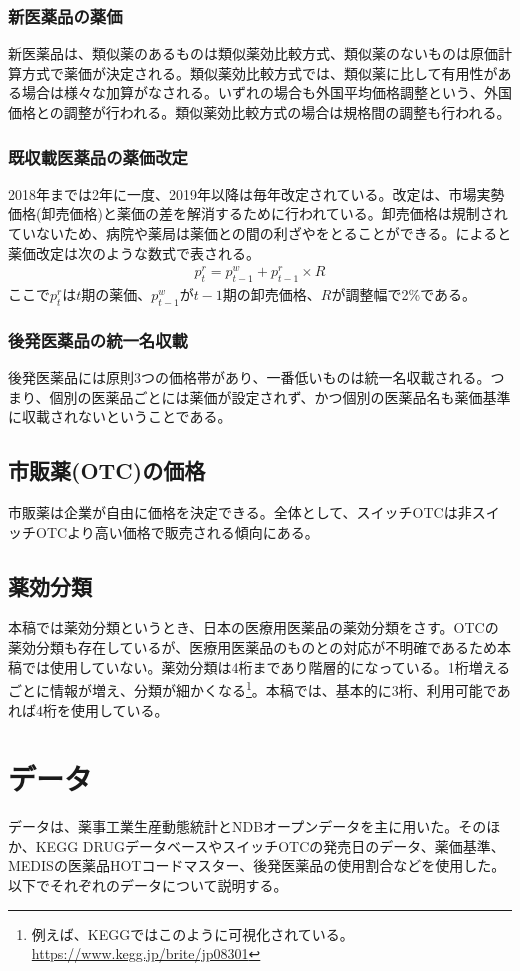 \documentclass[a4paper,11pt,uplatex]{jsarticle}
\theoremstyle{definition}
\begin{document}
\subsubsection{新医薬品の薬価}
新医薬品は、類似薬のあるものは類似薬効比較方式、類似薬のないものは原価計算方式で薬価が決定される。類似薬効比較方式では、類似薬に比して有用性がある場合は様々な加算がなされる。いずれの場合も外国平均価格調整という、外国価格との調整が行われる。類似薬効比較方式の場合は規格間の調整も行われる。
\subsubsection{既収載医薬品の薬価改定}
2018年までは2年に一度、2019年以降は毎年改定されている。改定は、市場実勢価格(卸売価格)と薬価の差を解消するために行われている。卸売価格は規制されていないため、病院や薬局は薬価との間の利ざやをとることができる。\cite{Iizuka2007}によると薬価改定は次のような数式で表される。
\begin{align*}
p^r_t=p^w_{t-1}+p^r_{t-1}\times R
\end{align*}
ここで\(p^r_t\)は\(t\)期の薬価、\(p^w_{t-1}\)が\(t-1\)期の卸売価格、\(R\)が調整幅で2\%である。
\subsubsection{後発医薬品の統一名収載}
後発医薬品には原則3つの価格帯があり、一番低いものは統一名収載される。つまり、個別の医薬品ごとには薬価が設定されず、かつ個別の医薬品名も薬価基準に収載されないということである。
\subsection{市販薬(OTC)の価格}
市販薬は企業が自由に価格を決定できる。全体として、スイッチOTCは非スイッチOTCより高い価格で販売される傾向にある\citep{iseikyoku2021}。

\subsection{薬効分類}
本稿では薬効分類というとき、日本の医療用医薬品の薬効分類をさす。OTCの薬効分類も存在しているが、医療用医薬品のものとの対応が不明確であるため本稿では使用していない。薬効分類は4桁まであり階層的になっている。1桁増えるごとに情報が増え、分類が細かくなる\footnote{例えば、KEGGではこのように可視化されている。\url{https://www.kegg.jp/brite/jp08301}}。本稿では、基本的に3桁、利用可能であれば4桁を使用している。
\section{データ} 
データは、薬事工業生産動態統計とNDBオープンデータを主に用いた。そのほか、KEGG DRUGデータベースやスイッチOTCの発売日のデータ、薬価基準、MEDISの医薬品HOTコードマスター、後発医薬品の使用割合などを使用した。以下でそれぞれのデータについて説明する。
\end{document}
